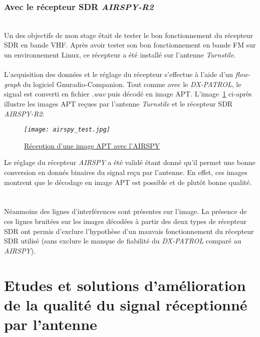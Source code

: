 \documentclass[12pt,fleqn]{book} %
\begin{document}
\subsection{Avec le récepteur SDR \emph{AIRSPY-R2}}
~\\Un des objectifs de mon stage était de tester le bon fonctionnement du récepteur SDR en bande VHF. Après avoir tester son bon fonctionnement en bande FM sur un environnement Linux, ce récepteur a été installé sur l'antenne \emph{Turnstile}.
~\\\\L'acquisition des données et le réglage du récepteur s'effectue à l'aide d'un \emph{flow-graph} du logiciel Gnuradio-Companion. Tout comme avec le \emph{DX-PATROL}, le signal est converti en fichier \emph{.wav} puis décodé en image APT. L'image~\underline{\color{blue}\ref{airspy_test}} ci-après illustre les images APT reçues par l'antenne \emph{Turnstile} et le récepteur SDR \emph{AIRSPY-R2}:
\begin{figure}[H]
	\centering
	\itshape
	\texttt{[image: airspy\_test.jpg]}
	\caption{\label{airspy_test} \underline{Réception d'une image APT avec l'AIRSPY}}
\end{figure}
\noindent Le réglage du récepteur \emph{AIRSPY} a été validé étant donné qu'il permet une bonne conversion en donnés binaires du signal reçu par l'antenne. En effet, ces images montrent que le décodage en image APT est possible et de plutôt bonne qualité.
~\\\\Néanmoins des lignes d'interférences sont présentes sur l'image. La présence de ces lignes bruitées sur les images décodées à partir des deux types de récepteur SDR ont permis d'exclure l'hypothèse d'un mauvais fonctionnement du récepteur SDR utilisé (sans exclure le manque de fiabilité du \emph{DX-PATROL} comparé au \emph{AIRSPY}). 
\chapter{Etudes et solutions d'amélioration de la qualité du signal réceptionné par l'antenne}
\end{document}
